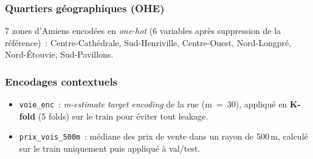 \documentclass[12pt,a4paper]{article}
\begin{document}
\subsubsection{Quartiers g\'eographiques (OHE)}

7 zones d'Amiens encod\'ees en \textit{one-hot} (6 variables apr\`es suppression de la r\'ef\'erence)~: Centre-Cath\'edrale, Sud-Henriville, Centre-Ouest, Nord-Longpr\'e, Nord-\'Etouvie, Sud-Pavillons.

\subsubsection{Encodages contextuels}

\begin{itemize}
    \item \texttt{voie\_enc}~: \textit{m-estimate target encoding} de la rue (m~=~30), appliqu\'e en \textbf{K-fold} (5 folds) sur le train pour \'eviter tout leakage.
    \item \texttt{prix\_vois\_500m}~: m\'ediane des prix de vente dans un rayon de 500\,m, calcul\'e sur le train uniquement puis appliqu\'e \`a val/test.
\end{itemize}
\end{document}
